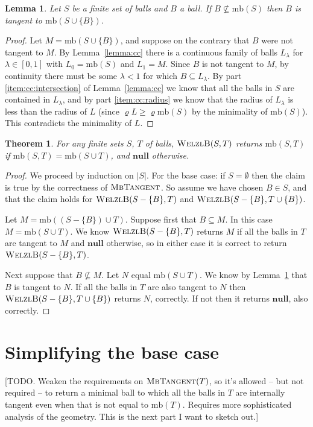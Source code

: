 \documentclass[a4paper]{article}
\newtheorem{lemma}{Lemma}[section]
\newtheorem{theorem}{Theorem}[section]
\newcommand\alg[1]{\mbox{\textsc{#1}}}
\newcommand\undef{\mathbf{null}}
\newcommand\mb{\mathrm{mb}}
\let\radius\varrho
\begin{document}
\begin{lemma}\label{lemma:tangent}
  Let $S$ be a finite set of balls and $B$ a ball. If $B\not\subseteq\mb(S)$ then $B$ is tangent to $\mb(S\cup\{B\})$.
\end{lemma}
\begin{proof}
  Let $M = \mb(S\cup\{B\})$, and suppose on the contrary that $B$ were not tangent to $M$.
  By Lemma~\ref{lemma:cc} there is a continuous family of balls $L_\lambda$ for $\lambda\in[0,1]$
  with $L_0=\mb(S)$ and $L_1=M$. Since $B$ is not tangent to $M$, by continuity there must be some $\lambda<1$ for which $B\subseteq L_\lambda$. By part \ref{item:cc:intersection} of Lemma~\ref{lemma:cc} we know that all the balls in $S$ are contained in $L_\lambda$, and by part \ref{item:cc:radius} we know that the radius of $L_\lambda$ is less than the radius of $L$ (since $\radius L\geq \radius\mb(S)$ by the minimality of $\mb(S)$). This contradicts the minimality of $L$.
\end{proof}

\begin{theorem}
  For any finite sets $S$, $T$ of balls, $\alg{WelzlB}(S,T)$ returns $\mb(S,T)$ if $\mb(S,T)=\mb(S\cup T)$, and $\undef$ otherwise.
\end{theorem}
\begin{proof}
  We proceed by induction on $|S|$. For the base case: if $S=\emptyset$ then the claim is true by the correctness of $\alg{MbTangent}$. So assume we have chosen $B\in S$, and that the claim holds for $\alg{WelzlB}(S-\{B\},T)$ and $\alg{WelzlB}(S-\{B\},T\cup\{B\})$.

  Let $M = \mb((S-\{B\})\cup T)$. Suppose first that $B\subseteq M$. In this case $M=\mb(S\cup T)$. We know $\alg{WelzlB}(S-\{B\},T)$ returns $M$ if all the balls in $T$ are tangent to $M$ and $\undef$ otherwise, so in either case it is correct to return $\alg{WelzlB}(S-\{B\},T)$.

  Next suppose that $B\not\subseteq M$. Let $N$ equal $\mb(S\cup T)$. We know by Lemma~\ref{lemma:tangent} that $B$ is tangent to $N$. If all the balls in $T$ are also tangent to $N$ then $\alg{WelzlB}(S-\{B\}, T\cup\{B\})$ returns $N$, correctly. If not then it returns $\undef$, also correctly.
\end{proof}

\section{Simplifying the base case}
[TODO. Weaken the requirements on $\alg{MbTangent}(T)$, so it's allowed -- but not required -- to return a minimal ball to which all the balls in $T$ are internally tangent even when that is not equal to $\mb(T)$. Requires more sophisticated analysis of the geometry. This is the next part I want to sketch out.]
\end{document}
